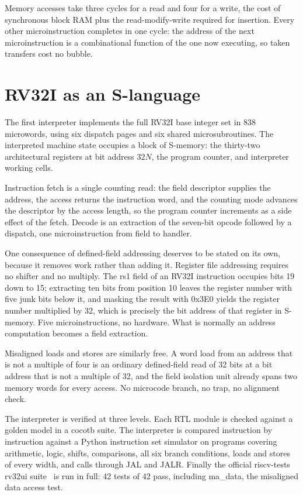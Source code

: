 \documentclass[11pt,a4paper]{article}
\begin{document}
Memory accesses take three cycles for a read and four for a write, the
cost of synchronous block RAM plus the read-modify-write required for
insertion. Every other microinstruction completes in one cycle: the
address of the next microinstruction is a combinational function of the
one now executing, so taken transfers cost no bubble.

\section{RV32I as an S-language}
\label{sec:rv32i}

The first interpreter implements the full RV32I base integer set in 838
microwords, using six dispatch pages and six shared microsubroutines.
The interpreted machine state occupies a block of S-memory: the
thirty-two architectural registers at bit address $32N$, the program
counter, and interpreter working cells.

Instruction fetch is a single counting read: the field descriptor
supplies the address, the access returns the instruction word, and the
counting mode advances the descriptor by the access length, so the
program counter increments as a side effect of the fetch. Decode is an
extraction of the seven-bit opcode followed by a dispatch, one
microinstruction from field to handler.

One consequence of defined-field addressing deserves to be stated on
its own, because it removes work rather than adding it. Register file
addressing requires no shifter and no multiply. The rs1 field of an
RV32I instruction occupies bits 19 down to 15; extracting ten bits from
position 10 leaves the register number with five junk bits below it,
and masking the result with 0x3E0 yields the register number multiplied
by 32, which is precisely the bit address of that register in S-memory.
Five microinstructions, no hardware. What is normally an address
computation becomes a field extraction.

Misaligned loads and stores are similarly free. A word load from an
address that is not a multiple of four is an ordinary defined-field
read of 32 bits at a bit address that is not a multiple of 32, and the
field isolation unit already spans two memory words for every access.
No microcode branch, no trap, no alignment check.

The interpreter is verified at three levels. Each RTL module is checked
against a golden model in a cocotb suite. The interpreter is compared
instruction by instruction against a Python instruction set simulator
on programs covering arithmetic, logic, shifts, comparisons, all six
branch conditions, loads and stores of every width, and calls through
JAL and JALR. Finally the official riscv-tests rv32ui
suite~\cite{riscvtests} is run in full: 42 tests of 42 pass, including ma\_data, the misaligned data
access test.
\end{document}

